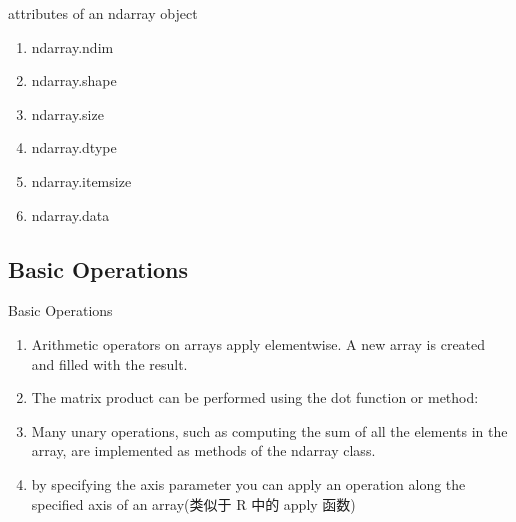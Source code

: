 \documentclass[ignorenonframetext,11pt,xcolor=dvipsnames,hyperref={colorlinks,allcolors=.,urlcolor=blue, citecolor=violet, bookmarksdepth=4},aspectratio=1610]{beamer}
\providecommand{\tightlist}{%
  \setlength{\itemsep}{0pt}\setlength{\parskip}{0pt}}
\begin{document}
\begin{frame}{attributes of an ndarray object}
\protect\hypertarget{attributes-of-an-ndarray-object}{}

\begin{enumerate}
\tightlist
\item
  ndarray.ndim
\item
  ndarray.shape
\item
  ndarray.size
\item
  ndarray.dtype
\item
  ndarray.itemsize
\item
  ndarray.data
\end{enumerate}

\end{frame}

\hypertarget{basic-operations}{%
\subsection{Basic Operations}\label{basic-operations}}

\begin{frame}{Basic Operations}
\protect\hypertarget{basic-operations-1}{}

\begin{enumerate}
\tightlist
\item
  Arithmetic operators on arrays apply elementwise. A new array is
  created and filled with the result.
\item
  The matrix product can be performed using the dot function or method:
\item
  Many unary operations, such as computing the sum of all the elements
  in the array, are implemented as methods of the ndarray class.
\item
  by specifying the axis parameter you can apply an operation along the
  specified axis of an array(类似于 R 中的 apply 函数)
\end{enumerate}

\end{frame}
\end{document}
